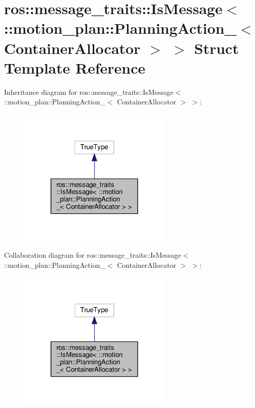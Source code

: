 \hypertarget{structros_1_1message__traits_1_1IsMessage_3_01_1_1motion__plan_1_1PlanningAction___3_01ContainerAllocator_01_4_01_4}{}\section{ros\+:\+:message\+\_\+traits\+:\+:Is\+Message$<$ \+:\+:motion\+\_\+plan\+:\+:Planning\+Action\+\_\+$<$ Container\+Allocator $>$ $>$ Struct Template Reference}
\label{structros_1_1message__traits_1_1IsMessage_3_01_1_1motion__plan_1_1PlanningAction___3_01ContainerAllocator_01_4_01_4}


Inheritance diagram for ros\+:\+:message\+\_\+traits\+:\+:Is\+Message$<$ \+:\+:motion\+\_\+plan\+:\+:Planning\+Action\+\_\+$<$ Container\+Allocator $>$ $>$\+:
\nopagebreak
\begin{figure}[H]
\begin{center}
\leavevmode
\includegraphics[width=209pt]{structros_1_1message__traits_1_1IsMessage_3_01_1_1motion__plan_1_1PlanningAction___3_01Containere62d481f54c9f70a58c41ee114b58b95}
\end{center}
\end{figure}


Collaboration diagram for ros\+:\+:message\+\_\+traits\+:\+:Is\+Message$<$ \+:\+:motion\+\_\+plan\+:\+:Planning\+Action\+\_\+$<$ Container\+Allocator $>$ $>$\+:
\nopagebreak
\begin{figure}[H]
\begin{center}
\leavevmode
\includegraphics[width=209pt]{structros_1_1message__traits_1_1IsMessage_3_01_1_1motion__plan_1_1PlanningAction___3_01Container4954550bb5f89a75105517d1adcbcac8}
\end{center}
\end{figure}


